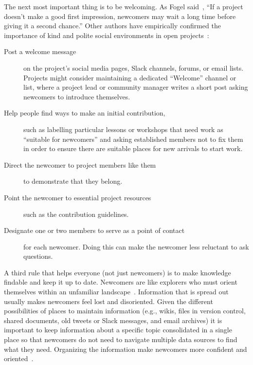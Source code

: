 The next most important thing is to be welcoming.
As Fogel said~\cite{Foge2005},
``If a project doesn't make a good first impression,
newcomers may wait a long time before giving it a second chance.''
Other authors have empirically confirmed the importance of kind and polite social environments
in open projects~\cite{Sing2012,Stei2013,Stei2018}:

\begin{description}

\item[Post a welcome message]
  on the project's social media pages, Slack channels, forums, or email lists.
  Projects might consider maintaining a dedicated ``Welcome'' channel or list,
  where a project lead or community manager writes a short post asking newcomers to introduce themselves.

\item[Help people find ways to make an initial contribution,]
  such as labelling particular lessons or workshops that need work as ``suitable for newcomers''
  and asking established members not to fix them
  in order to ensure there are suitable places for new arrivals to start work.

\item[Direct the newcomer to project members like them]
  to demonstrate that they belong.

\item[Point the newcomer to essential project resources]
  such as the contribution guidelines.

\item[Designate one or two members to serve as a point of contact]
  for each newcomer.
  Doing this can make the newcomer less reluctant to ask questions.

\end{description}

A third rule that helps everyone (not just newcomers)
is to make knowledge findable and keep it up to date.
Newcomers are like explorers who must orient themselves within an unfamiliar landscape~\cite{Dage2010}.
Information that is spread out usually makes newcomers feel lost and disoriented.
Given the different possibilities of places to maintain information
(e.g., wikis, files in version control, shared documents, old tweets or Slack messages, and email archives)
it is important to keep information about a specific topic consolidated in a single place
so that newcomers do not need to navigate multiple data sources to find what they need.
Organizing the information make newcomers more confident and oriented~\cite{Stei2016}.

